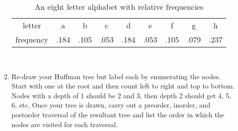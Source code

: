 \documentclass[]{article}
\begin{document}
\begin{enumerate}
\begin{enumerate}
\begin{table}[!htpb]
\begin{center}
\begin{tabular}{ccccccccc}
letter    & a & b & c & d &  e & f & g & h \\
frequency & .184 & .105 & .053 & .184 & .053 & .105 & .079 & .237
\end{tabular}
\end{center}
\caption{An eight letter alphabet with relative frequencies}
\label{tab:freq}
\end{table}

\newpage \thispagestyle{empty}
\mbox{ }
\newpage \thispagestyle{empty}

\item Re-draw your Huffman tree but label each by enumerating the nodes. Start with one at the root and then count left to right and top to bottom. Nodes with a depth of 1 should be 2 and 3, then depth 2 should get 4, 5, 6, etc. Once your tree is drawn, carry out a preorder, inorder, and postorder traversal of the resultant tree and list the order in which the nodes are visited for each traversal.

\end{enumerate}

\end{enumerate}
\end{document}
